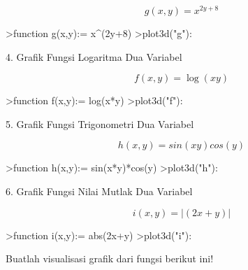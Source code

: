\documentclass[a4paper,10pt]{article}
\begin{document}
\begin{eulernotebook}
\begin{eulercomment}
\begin{eulercomment}
\begin{eulercomment}
\begin{eulercomment}
\begin{eulercomment}
\begin{eulercomment}
\begin{eulercomment}
\begin{eulercomment}
\begin{eulercomment}
\begin{eulercomment}
\begin{eulercomment}
\begin{eulercomment}
\begin{eulercomment}
\end{eulercomment}
\begin{eulerformula}
\[
g(x,y) = x^{2y+8}
\]
\end{eulerformula}
\begin{eulerprompt}
>function g(x,y):= x^(2y+8)
>plot3d("g"):
\end{eulerprompt}
\begin{eulercomment}
4. Grafik Fungsi Logaritma Dua Variabel

\end{eulercomment}
\begin{eulerformula}
\[
f(x,y)=\log(xy)
\]
\end{eulerformula}
\begin{eulerprompt}
>function f(x,y):= log(x*y)
>plot3d("f"):
\end{eulerprompt}
\begin{eulercomment}
5. Grafik Fungsi Trigonometri Dua Variabel

\end{eulercomment}
\begin{eulerformula}
\[
h(x,y)=sin(xy)cos(y)
\]
\end{eulerformula}
\begin{eulerprompt}
>function h(x,y):= sin(x*y)*cos(y)
>plot3d("h"):
\end{eulerprompt}
\begin{eulercomment}
6. Grafik Fungsi Nilai Mutlak Dua Variabel

\end{eulercomment}
\begin{eulerformula}
\[
i(x,y)=|(2x+y)|
\]
\end{eulerformula}
\begin{eulerprompt}
>function i(x,y):= abs(2x+y)
>plot3d("i"):
\end{eulerprompt}
\begin{eulercomment}
Buatlah visualisasi grafik dari fungsi berikut ini!


\end{eulercomment}
\end{eulercomment}
\end{eulercomment}
\end{eulercomment}
\end{eulercomment}
\end{eulercomment}
\end{eulercomment}
\end{eulercomment}
\end{eulercomment}
\end{eulercomment}
\end{eulercomment}
\end{eulercomment}
\end{eulercomment}
\end{eulernotebook}
\end{document}
